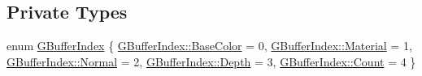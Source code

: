 \subsection*{Private Types}
\begin{DoxyCompactItemize}
\item 
enum \hyperlink{structmage_1_1_g_buffer_a72f0fc0f46052fdc9872c48c57894607}{G\+Buffer\+Index} \{ \newline
\hyperlink{structmage_1_1_g_buffer_a72f0fc0f46052fdc9872c48c57894607a69d5778a1901c597d7b433bacf1cb679}{G\+Buffer\+Index\+::\+Base\+Color} = 0, 
\hyperlink{structmage_1_1_g_buffer_a72f0fc0f46052fdc9872c48c57894607ad92a8333dd3ccb895cc65f7455b71206}{G\+Buffer\+Index\+::\+Material} = 1, 
\hyperlink{structmage_1_1_g_buffer_a72f0fc0f46052fdc9872c48c57894607a960b44c579bc2f6818d2daaf9e4c16f0}{G\+Buffer\+Index\+::\+Normal} = 2, 
\hyperlink{structmage_1_1_g_buffer_a72f0fc0f46052fdc9872c48c57894607a675056ad1441b6375b2c5abd48c27ef1}{G\+Buffer\+Index\+::\+Depth} = 3, 
\newline
\hyperlink{structmage_1_1_g_buffer_a72f0fc0f46052fdc9872c48c57894607ae93f994f01c537c4e2f7d8528c3eb5e9}{G\+Buffer\+Index\+::\+Count} = 4
 \}
\end{DoxyCompactItemize}
